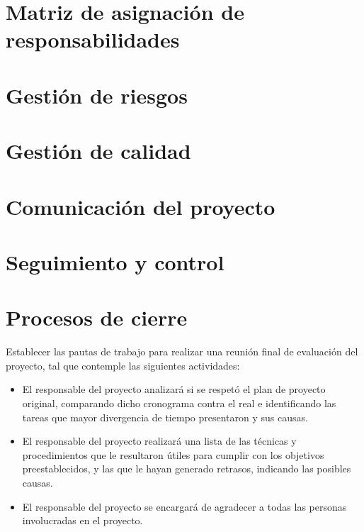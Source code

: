 \documentclass[
12pt,
spanish,
singlespacing,
parskip,
headsepline,]{article}
\begin{document}
\section{Matriz de asignación de responsabilidades}

\section{Gestión de riesgos}

\section{Gestión de calidad}

\section{Comunicación del proyecto}

\section{Seguimiento y control}

\section{Procesos de cierre}

Establecer las pautas de trabajo para realizar una reunión final de evaluación del proyecto, tal que contemple las siguientes actividades:

\begin{itemize}
	\item El responsable del proyecto analizará si se respetó el plan de proyecto original, comparando dicho cronograma contra el real e identificando las tareas que mayor divergencia de tiempo presentaron y sus causas.
	\item El responsable del proyecto realizará una lista de las técnicas y procedimientos que le resultaron útiles para cumplir con los objetivos preestablecidos, y las que le hayan generado retrasos, indicando las posibles causas.
	\item El responsable del proyecto se encargará de agradecer a todas las personas involucradas en el proyecto.
\end{itemize}
\end{document}
